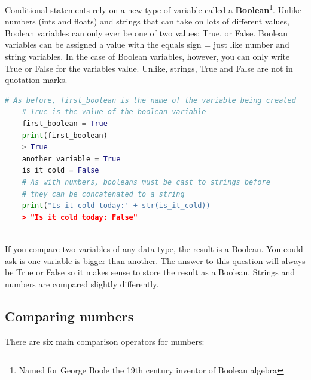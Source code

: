 \documentclass[]{article}
\begin{document}
Conditional statements rely on a new type of variable called a \textbf{Boolean}\footnote{Named for George Boole the 19th century inventor of Boolean algebra }.  Unlike numbers (ints and floats) and strings that can take on lots of different values, Boolean variables can only ever be one of two values: True, or False. Boolean variables can be assigned a value with the equals sign = just like number and string variables.  In the case of Boolean variables, however, you can only write True or False for the variables value. Unlike, strings, True and False are not in quotation marks. 
\begin{lstlisting}[language=python]
    # As before, first_boolean is the name of the variable being created
    # True is the value of the boolean variable
    first_boolean = True
    print(first_boolean)
    > True
    another_variable = True
    is_it_cold = False
    # As with numbers, booleans must be cast to strings before 
    # they can be concatenated to a string
    print("Is it cold today:' + str(is_it_cold))
    > "Is it cold today: False"
    
\end{lstlisting}

If you compare two variables of any data type, the result is a Boolean. You could ask is one variable is bigger than another.  The answer to this question will always be True or False so it makes sense to store the result as a Boolean.  Strings and numbers are compared slightly differently.

\subsection{Comparing numbers}

There are six main comparison operators for numbers:
\end{document}
